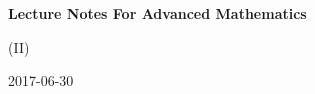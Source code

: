 \begin{center}
	\bigskip
	
	
	\bigskip
	
	{\large\bf Lecture Notes For Advanced Mathematics
	
	(II)}
	
	2017-06-30
\end{center}